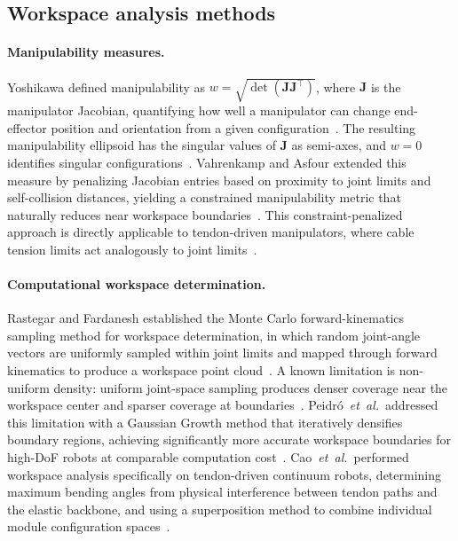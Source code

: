 \subsection{Workspace analysis methods}
\label{subsec:prior_workspace}

\paragraph{Manipulability measures.}
Yoshikawa defined manipulability as $w = \sqrt{\det(\mathbf{J}\mathbf{J}^\top)}$,
where $\mathbf{J}$ is the manipulator Jacobian, quantifying how well a
manipulator can change end-effector position and orientation from a given
configuration~\cite{Yoshikawa1985Manipulability}.
The resulting manipulability ellipsoid has the singular values of
$\mathbf{J}$ as semi-axes, and $w = 0$ identifies singular
configurations~\cite{Yoshikawa1985Manipulability}.
Vahrenkamp and Asfour extended this measure by penalizing Jacobian entries
based on proximity to joint limits and self-collision distances, yielding
a constrained manipulability metric that naturally reduces near workspace
boundaries~\cite{Vahrenkamp2015ConstrainedManipulability}.
This constraint-penalized approach is directly applicable to tendon-driven
manipulators, where cable tension limits act analogously to joint
limits~\cite{Vahrenkamp2015ConstrainedManipulability}.

\paragraph{Computational workspace determination.}
Rastegar and Fardanesh established the Monte Carlo forward-kinematics
sampling method for workspace determination, in which random joint-angle
vectors are uniformly sampled within joint limits and mapped through
forward kinematics to produce a workspace point
cloud~\cite{Rastegar1990WorkspaceMonteCarlo}.
A known limitation is non-uniform density: uniform joint-space sampling
produces denser coverage near the workspace center and sparser coverage
at boundaries~\cite{Rastegar1990WorkspaceMonteCarlo}.
Peidr\'{o}~\emph{et~al.}\ addressed this limitation with a Gaussian Growth
method that iteratively densifies boundary regions, achieving significantly
more accurate workspace boundaries for high-\ac{DoF} robots at comparable
computation cost~\cite{Peidro2017GaussianGrowth}.
Cao~\emph{et~al.}\ performed workspace analysis specifically on
tendon-driven continuum robots, determining maximum bending angles from
physical interference between tendon paths and the elastic backbone, and
using a superposition method to combine individual module configuration
spaces~\cite{Cao2017WorkspaceTDCR}.

